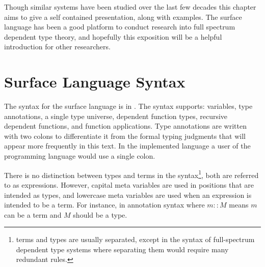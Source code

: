 Though similar systems have been studied over the last few decades this chapter aims to give a self contained presentation, along with examples.
The surface language has been a good platform to conduct research into full spectrum dependent type theory, and hopefully this exposition will be a helpful introduction for other researchers.
 
\section{Surface Language Syntax}
 
The syntax for the surface language is in .
The syntax supports: variables, type annotations, a single type universe, dependent function types, recursive dependent functions, and function applications.
Type annotations are written with two colons to differentiate it from the formal typing judgments that will appear more frequently in this text.
In the implemented language a user of the programming language would use a single colon.
 
There is no distinction between types and terms in the syntax\footnote{
 terms and types are usually separated, except in the syntax of full-spectrum dependent type systems where separating them would require many redundant rules.
 }, both are referred to as expressions.
However, capital meta variables are used in positions that are intended as types, and lowercase meta variables are used when an expression is intended to be a term.
For instance, in annotation syntax where $m::M$ means $m$ can be a term and $M$ should be a type.
 
 
